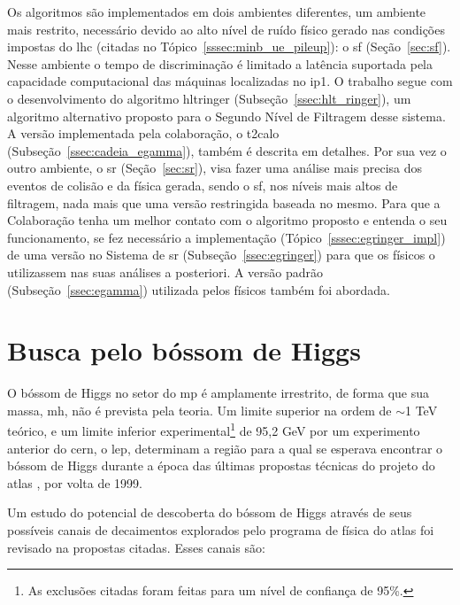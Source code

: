 Os algoritmos são implementados em dois ambientes diferentes, um ambiente mais
restrito, necessário devido ao alto nível de ruído físico gerado nas condições 
impostas do \gls{lhc} (citadas no Tópico~\ref{sssec:minb_ue_pileup}): o
\glsdesc{sf} (Seção~\ref{sec:sf}). Nesse ambiente o tempo de discriminação 
é limitado a latência suportada pela capacidade computacional das máquinas localizadas 
no \gls{ip}1. O trabalho segue com o desenvolvimento do algoritmo
\acrlong{hltringer} (Subseção~\ref{ssec:hlt_ringer}), um algoritmo alternativo proposto para o
Segundo Nível de Filtragem desse sistema. A versão implementada pela
colaboração, o \gls{t2calo} (Subseção~\ref{ssec:cadeia_egamma}), 
também é descrita em detalhes. Por sua vez o outro ambiente, o \glsdesc{sr}
(Seção~\ref{sec:sr}), visa fazer uma análise mais precisa dos eventos de colisão e da 
física gerada, sendo o \glsdesc{sf}, nos níveis mais altos de filtragem, 
nada mais que uma versão restringida baseada no mesmo. Para que a Colaboração tenha 
um melhor contato com o algoritmo proposto e entenda o seu funcionamento, se fez
necessário a implementação (Tópico~\ref{sssec:egringer_impl}) de uma versão no Sistema 
de \glsdesc{sr} (Subseção~\ref{ssec:egringer}) para que os físicos o utilizassem nas suas 
análises a posteriori. A versão padrão (Subseção~\ref{ssec:egamma}) utilizada
pelos físicos também foi abordada.

\section{Busca pelo bóssom de Higgs}
\label{sec:busca_higgs}


O bóssom de Higgs no setor do \gls{mp} é amplamente irrestrito, de forma que sua
massa, \acrshort{mh}, não é prevista pela teoria. Um limite superior na ordem de
$\sim$1 TeV teórico, e um limite inferior experimental\footnote{As exclusões
citadas foram feitas para um nível de confiança de 95\%.\label{fn:95cl}} de 95,2
GeV \cite{lep_higgs_1999} por um experimento anterior do \gls{cern}, o \gls{lep}, determinam a região para a qual
se esperava encontrar o bóssom de Higgs durante a época das últimas propostas técnicas
do projeto do \gls{atlas} \cite{ATLAS_TDR,ATLAS_TDR2}, por volta de 1999. 

Um estudo do potencial de descoberta do bóssom de Higgs através de seus
possíveis canais de decaimentos explorados pelo programa de física do
\gls{atlas} foi revisado na propostas citadas. Esses canais são:

